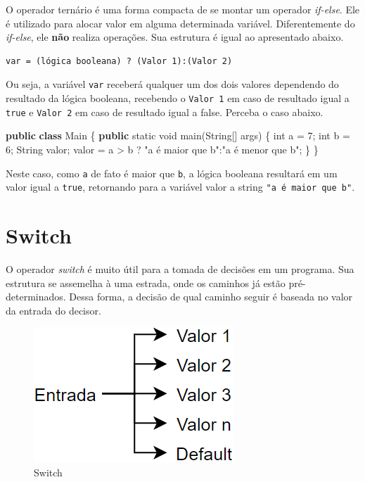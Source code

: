 \documentclass[
]{book}
\newenvironment{Shaded}{\begin{snugshade}}{\end{snugshade}}
\newcommand{\BuiltInTok}[1]{#1}
\newcommand{\DataTypeTok}[1]{\textcolor[rgb]{0.13,0.29,0.53}{#1}}
\newcommand{\DecValTok}[1]{\textcolor[rgb]{0.00,0.00,0.81}{#1}}
\newcommand{\FunctionTok}[1]{\textcolor[rgb]{0.00,0.00,0.00}{#1}}
\newcommand{\KeywordTok}[1]{\textcolor[rgb]{0.13,0.29,0.53}{\textbf{#1}}}
\newcommand{\NormalTok}[1]{#1}
\newcommand{\StringTok}[1]{\textcolor[rgb]{0.31,0.60,0.02}{#1}}
\begin{document}
O operador ternário é uma forma compacta de se montar um operador \emph{if-else}. Ele é utilizado para alocar valor em alguma determinada variável. Diferentemente do \emph{if-else}, ele \textbf{não} realiza operações. Sua estrutura é igual ao apresentado abaixo.

\begin{verbatim}
var = (lógica booleana) ? (Valor 1):(Valor 2)
\end{verbatim}

Ou seja, a variável \texttt{var} receberá qualquer um dos dois valores dependendo do resultado da lógica booleana, recebendo o \texttt{Valor\ 1} em caso de resultado igual a \texttt{true} e \texttt{Valor\ 2} em caso de resultado igual a false. Perceba o caso abaixo.

\begin{Shaded}
\begin{Highlighting}[]
\KeywordTok{public} \KeywordTok{class}\NormalTok{ Main \{}
    \KeywordTok{public} \DataTypeTok{static} \DataTypeTok{void} \FunctionTok{main}\NormalTok{(}\BuiltInTok{String}\NormalTok{[] args) \{}
        \DataTypeTok{int}\NormalTok{ a = }\DecValTok{7}\NormalTok{;}
        \DataTypeTok{int}\NormalTok{ b = }\DecValTok{6}\NormalTok{;}
        \BuiltInTok{String}\NormalTok{ valor;}
\NormalTok{        valor = a > b ? }\StringTok{"a é maior que b"}\NormalTok{:}\StringTok{"a é menor que b"}\NormalTok{;}
\NormalTok{    \}}
\NormalTok{\}}
\end{Highlighting}
\end{Shaded}

Neste caso, como \texttt{a} de fato é maior que \texttt{b}, a lógica booleana resultará em um valor igual a \texttt{true}, retornando para a variável valor a string \texttt{"a\ é\ maior\ que\ b"}.

\hypertarget{switch}{%
\section{Switch}\label{switch}}

O operador \emph{switch} é muito útil para a tomada de decisões em um programa. Sua estrutura se assemelha à uma estrada, onde os caminhos já estão pré-determinados. Dessa forma, a decisão de qual caminho seguir é baseada no valor da entrada do decisor.

\begin{figure}
\centering
\includegraphics{imagens/switch.png}
\caption{Switch}
\end{figure}
\end{document}
